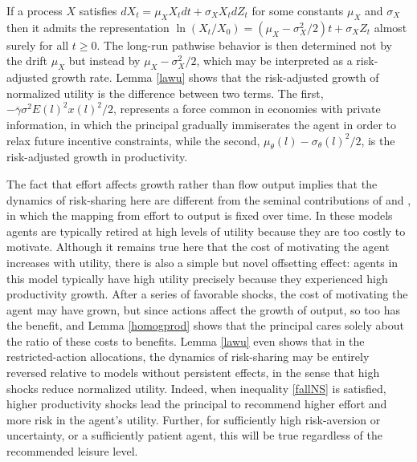 \documentclass[11pt]{article}
\theoremstyle{plain}
\begin{document}

If a process $X$ satisfies $dX_t = \mu_XX_tdt + \sigma_XX_tdZ_t$ for some constants $\mu_X$ and $\sigma_X$ then it admits the representation $\ln(X_t/X_0) = (\mu_X - \sigma_X^2/2)t + \sigma_XZ_t$ almost surely for all $t\geq0$. The long-run pathwise behavior is then determined not by the drift $\mu_X$ but instead by $\mu_X - \sigma_X^2/2$, which may be interpreted as a risk-adjusted growth rate. Lemma \ref{lawu} shows that the risk-adjusted growth of normalized utility is the difference between two terms. The first, $-\overline{\gamma}\sigma^2E(l)^2x(l)^2/2$, represents a force common in economies with private information, in which the principal gradually immiserates the agent in order to relax future incentive constraints, while the second, $\mu_{\theta}(l) - \sigma_{\theta}(l)^2/2$, is the risk-adjusted growth in productivity. 


The fact that effort affects growth rather than flow output implies that the dynamics of risk-sharing here are different from the seminal contributions of \cite{phelan_computing_1991} and \cite{sannikov_continuous-time_2008}, in which the mapping from effort to output is fixed over time. In these models agents are typically retired at high levels of utility because they are too costly to motivate. Although it remains true here that the cost of motivating the agent increases with utility, there is also a simple but novel offsetting effect: agents in this model typically have high utility precisely because they experienced high productivity growth. After a series of favorable shocks, the cost of motivating the agent may have grown, but since actions affect the growth of output, so too has the benefit, and Lemma \ref{homogprod} shows that the principal cares solely about the ratio of these costs to benefits. Lemma \ref{lawu} even shows that in the restricted-action allocations, the dynamics of risk-sharing may be entirely reversed relative to models without persistent effects, in the sense that high shocks reduce normalized utility. Indeed, when inequality \eqref{fallNS} is satisfied, higher productivity shocks lead the principal to recommend higher effort and more risk in the agent's utility. Further, for sufficiently high risk-aversion or uncertainty, or a sufficiently patient agent, this will be true regardless of the recommended leisure level. 
\end{document}
